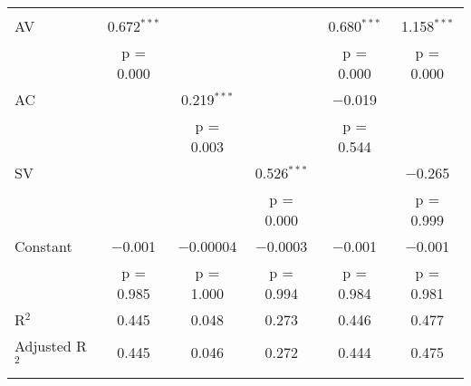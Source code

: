 
\begin{tabular}{@{\extracolsep{5pt}}lccccc} 
\\[-1.8ex]
\hline \\[-1.8ex] 
 AV & 0.672$^{***}$ &  &  & 0.680$^{***}$ & 1.158$^{***}$ \\ 
  & p = 0.000 &  &  & p = 0.000 & p = 0.000 \\ 
 AC &  & 0.219$^{***}$ &  & $-$0.019 &  \\ 
  &  & p = 0.003 &  & p = 0.544 &  \\ 
 SV &  &  & 0.526$^{***}$ &  & $-$0.265 \\ 
  &  &  & p = 0.000 &  & p = 0.999 \\ 
 Constant & $-$0.001 & $-$0.00004 & $-$0.0003 & $-$0.001 & $-$0.001 \\ 
  & p = 0.985 & p = 1.000 & p = 0.994 & p = 0.984 & p = 0.981 \\ 
R$^{2}$ & 0.445 & 0.048 & 0.273 & 0.446 & 0.477 \\ 
Adjusted R$^{2}$ & 0.445 & 0.046 & 0.272 & 0.444 & 0.475 \\ 
\hline \\[-1.8ex] 
\end{tabular} 
